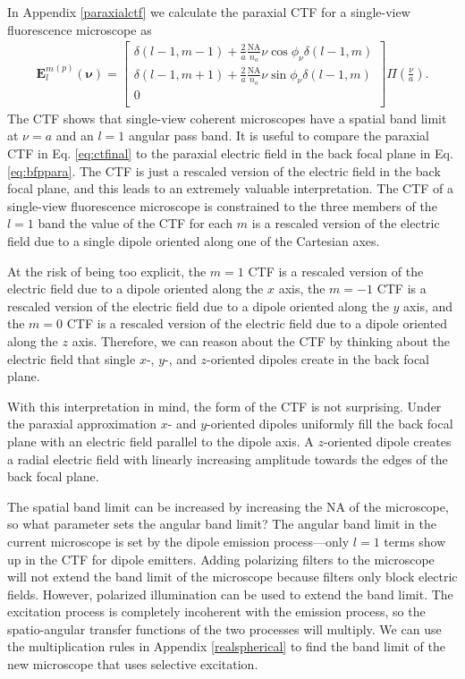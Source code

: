 \documentclass[11pt]{article}
\providecommand{\mb}[1]{\mathbf{#1}}
\providecommand{\bs}[1]{\boldsymbol{#1}}
\begin{document}
In Appendix \ref{paraxialctf} we calculate the paraxial CTF for a single-view fluorescence microscope as 
\begin{align}
  {\mb{E}_l^m}^{(p)}(\bs{\nu}) =
\begin{bmatrix}
  \delta(l-1, m-1) + \frac{2}{a}\frac{\text{NA}}{n_o}\nu\cos\phi_\nu\delta(l-1, m)\\
  \delta(l-1, m+1) + \frac{2}{a}\frac{\text{NA}}{n_o}\nu\sin\phi_\nu\delta(l-1, m)\\
  0\\
  \end{bmatrix}\Pi\left(\frac{\nu}{a}\right).\label{eq:ctfinal}
\end{align}
The CTF shows that single-view coherent microscopes have a spatial band limit at
$\nu = a$ and an $l=1$ angular pass band. It is useful to compare the paraxial
CTF in Eq. \ref{eq:ctfinal} to the paraxial electric field in the back focal
plane in Eq. \ref{eq:bfppara}. The CTF is just a rescaled version of the
electric field in the back focal plane, and this leads to an extremely valuable
interpretation. The CTF of a single-view fluorescence microscope is constrained
to the three members of the $l=1$ band the value of the CTF for each $m$ is a
rescaled version of the electric field due to a single dipole oriented along one
of the Cartesian axes.

At the risk of being too explicit, the $m=1$ CTF is a rescaled version of the
electric field due to a dipole oriented along the $x$ axis, the $m=-1$ CTF is a
rescaled version of the electric field due to a dipole oriented along the $y$
axis, and the $m=0$ CTF is a rescaled version of the electric field due to a
dipole oriented along the $z$ axis. Therefore, we can reason about the CTF by
thinking about the electric field that single $x$-, $y$-, and $z$-oriented dipoles
create in the back focal plane. 

With this interpretation in mind, the form of the CTF is not surprising. Under
the paraxial approximation $x$- and $y$-oriented dipoles uniformly fill the back
focal plane with an electric field parallel to the dipole axis. A $z$-oriented
dipole creates a radial electric field with linearly increasing amplitude towards
the edges of the back focal plane.

The spatial band limit can be increased by increasing the NA of the microscope,
so what parameter sets the angular band limit? The angular band limit in the
current microscope is set by the dipole emission process---only $l=1$ terms show
up in the CTF for dipole emitters. Adding polarizing filters to the microscope
will not extend the band limit of the microscope because filters only block
electric fields. However, polarized illumination can be used to extend the band
limit. The excitation process is completely incoherent with the emission
process, so the spatio-angular transfer functions of the two processes will
multiply. We can use the multiplication rules in Appendix \ref{realspherical} to
find the band limit of the new microscope that uses selective excitation.
\end{document}
